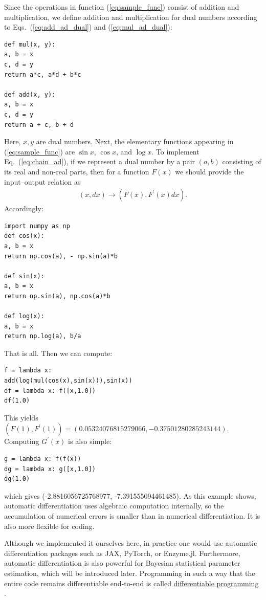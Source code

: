 Since the operations in function (\ref{eq:sample_func}) consist of addition and multiplication, we define addition and multiplication for dual numbers according to Eqs.~(\ref{eq:add_ad_dual}) and (\ref{eq:mul_ad_dual}):
\begin{verbatim}
def mul(x, y):
a, b = x
c, d = y
return a*c, a*d + b*c

def add(x, y):
a, b = x
c, d = y
return a + c, b + d
\end{verbatim}
Here, $x,y$ are dual numbers. Next, the elementary functions appearing in (\ref{eq:sample_func}) are $\sin{x}$, $\cos{x}$, and $\log{x}$. To implement Eq.~(\ref{eq:chain_ad}), if we represent a dual number by a pair $(a,b)$ consisting of its real and non-real parts, then for a function $F(x)$ we should provide the input–output relation as
\begin{align}
(x,dx) \to (F(x),F^\prime(x) dx) .
\end{align}
Accordingly:
\begin{verbatim}
import numpy as np
def cos(x):
a, b = x
return np.cos(a), - np.sin(a)*b

def sin(x):
a, b = x
return np.sin(a), np.cos(a)*b

def log(x):
a, b = x
return np.log(a), b/a
\end{verbatim}
That is all. Then we can compute:
\begin{verbatim}
f = lambda x:
add(log(mul(cos(x),sin(x))),sin(x))
df = lambda x: f([x,1.0])
df(1.0)
\end{verbatim}
This yields $(F(1), F^\prime(1)) = (0.05324076815279066, -0.37501280285243144)$. Computing $G^\prime(x)$ is also simple:
\begin{verbatim}
g = lambda x: f(f(x))
dg = lambda x: g([x,1.0])
dg(1.0)
\end{verbatim}
which gives (-2.8816056725768977, -7.391555094461485). As this example shows, automatic differentiation uses algebraic computation internally, so the accumulation of numerical errors is smaller than in numerical differentiation. It is also more flexible for coding.

Although we implemented it ourselves here, in practice one would use automatic differentiation packages such as JAX, PyTorch, or Enzyme.jl. Furthermore, automatic differentiation is also powerful for Bayesian statistical parameter estimation, which will be introduced later. Programming in such a way that the entire code remains differentiable end-to-end is called \underline{differentiable programming} \cite{2024arXiv240314606B}.